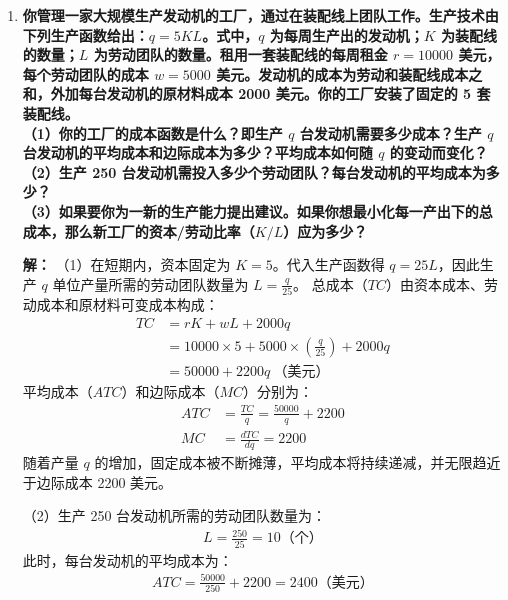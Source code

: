 \begin{enumerate}[label=\textbf{\arabic*.}, leftmargin=*]
		\newpage
		\item \textbf{你管理一家大规模生产发动机的工厂，通过在装配线上团队工作。生产技术由下列生产函数给出：$q = 5KL$。式中，$q$ 为每周生产出的发动机；$K$ 为装配线的数量；$L$ 为劳动团队的数量。租用一套装配线的每周租金 $r = 10000$ 美元，每个劳动团队的成本 $w = 5000$ 美元。发动机的成本为劳动和装配线成本之和，外加每台发动机的原材料成本 2000 美元。你的工厂安装了固定的 5 套装配线。\\（1）你的工厂的成本函数是什么？即生产 $q$ 台发动机需要多少成本？生产 $q$ 台发动机的平均成本和边际成本为多少？平均成本如何随 $q$ 的变动而变化？\\（2）生产 250 台发动机需投入多少个劳动团队？每台发动机的平均成本为多少？\\（3）如果要你为一新的生产能力提出建议。如果你想最小化每一产出下的总成本，那么新工厂的资本/劳动比率（$K/L$）应为多少？}
		
		\textbf{解：}
		（1）在短期内，资本固定为 $K = 5$。代入生产函数得 $q = 25L$，因此生产 $q$ 单位产量所需的劳动团队数量为 $L = \frac{q}{25}$。
		总成本（$TC$）由资本成本、劳动成本和原材料可变成本构成：
		\[
		\begin{aligned}
			TC &= rK + wL + 2000q \\
			&= 10000 \times 5 + 5000 \times \left(\frac{q}{25}\right) + 2000q \\
			&= 50000 + 2200q \ \text{（美元）}
		\end{aligned}
		\]
		平均成本（$ATC$）和边际成本（$MC$）分别为：
		\[
		\begin{aligned}
			ATC &= \frac{TC}{q} = \frac{50000}{q} + 2200 \\
			MC &= \frac{dTC}{dq} = 2200
		\end{aligned}
		\]
		随着产量 $q$ 的增加，固定成本被不断摊薄，平均成本将持续递减，并无限趋近于边际成本 2200 美元。
		
		（2）生产 250 台发动机所需的劳动团队数量为：
		\[
		\begin{aligned}
			L = \frac{250}{25} = 10 \text{（个）}
		\end{aligned}
		\]
		此时，每台发动机的平均成本为：
		\[
		\begin{aligned}
			ATC = \frac{50000}{250} + 2200 = 2400 \text{（美元）}
		\end{aligned}
		\]
		

\end{enumerate}
